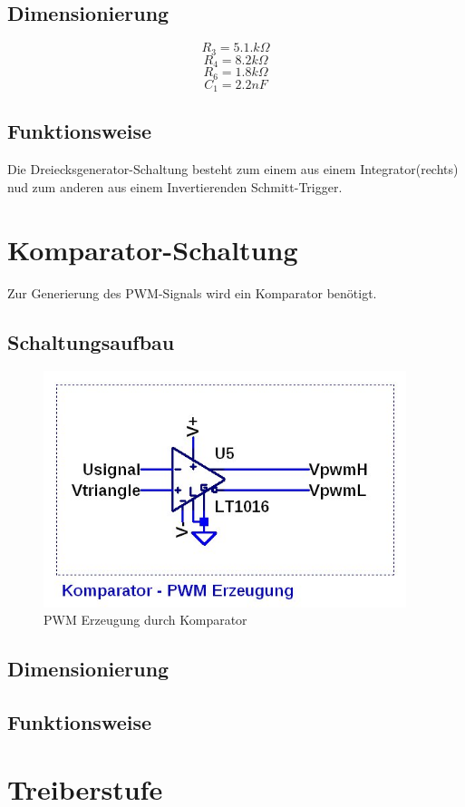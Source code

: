 \documentclass[11pt,a4paper,bibtotoc,oneside]{scrbook}
\begin{document}
\subsection{Dimensionierung}
\[R_3=5.1.k\Omega\]
\[R_4=8.2k\Omega\]
\[R_6=1.8k\Omega\]
\[C_1=2.2nF\]
\subsection{Funktionsweise}
Die Dreiecksgenerator-Schaltung besteht zum einem aus einem Integrator(rechts) nud zum anderen aus einem Invertierenden
Schmitt-Trigger.
\newpage
\section{Komparator-Schaltung}
Zur Generierung des PWM-Signals wird ein Komparator benötigt.
\subsection{Schaltungsaufbau}
    \begin{figure}[ht]
    \centering
        \includegraphics[width=300pt]{./picture/pwm.png}
        \caption{\label{lm324}{PWM Erzeugung durch Komparator}}
    \end{figure}
\subsection{Dimensionierung}
\subsection{Funktionsweise}
\section{Treiberstufe}
\end{document}
